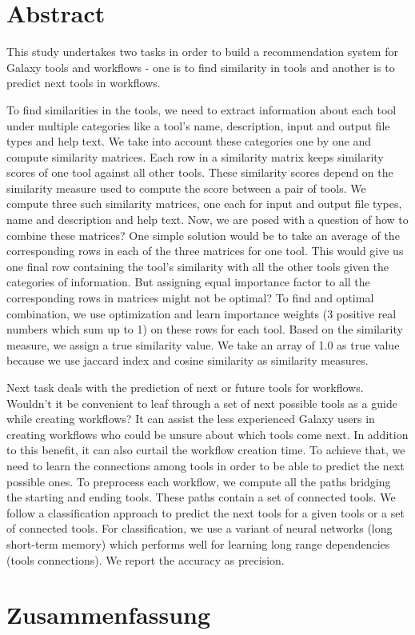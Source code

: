 \chapter*{Abstract}
This study undertakes two tasks in order to build a recommendation system for Galaxy tools and workflows - one is to find similarity in tools and another is to predict next tools in workflows.

To find similarities in the tools, we need to extract information about each tool under multiple categories like a tool's name, description, input and output file types and help text. We take into account these categories one by one and compute similarity matrices. Each row in a similarity matrix keeps similarity scores of one tool against all other tools. These similarity scores depend on the similarity measure used to compute the score between a pair of tools. We compute three such similarity matrices, one each for input and output file types, name and description and help text. Now, we are posed with a question of how to combine these matrices? One simple solution would be to take an average of the corresponding rows in each of the three matrices for one tool. This would give us one final row containing the tool's similarity with all the other tools given the categories of information. But assigning equal importance factor to all the corresponding rows in matrices might not be optimal? To find and optimal combination, we use optimization and learn importance weights (3 positive real numbers which sum up to 1) on these rows for each tool. Based on the similarity measure, we assign a true similarity value. We take an array of 1.0 as true value because we use jaccard index and cosine similarity as similarity measures.

Next task deals with the prediction of next or future tools for workflows. Wouldn't it be convenient to leaf through a set of next possible tools as a guide while creating workflows? It can assist the less experienced Galaxy users in creating workflows who could be unsure about which tools come next. In addition to this benefit, it can also curtail the workflow creation time. To achieve that, we need to learn the connections among tools in order to be able to predict the next possible ones. To preprocess each workflow, we compute all the paths bridging the starting and ending tools. These paths contain a set of connected tools. We follow a classification approach to predict the next tools for a given tools or a set of connected tools. For classification, we use a variant of neural networks (long short-term memory) which performs well for learning long range dependencies (tools connections). We report the accuracy as precision.


\chapter*{Zusammenfassung}
